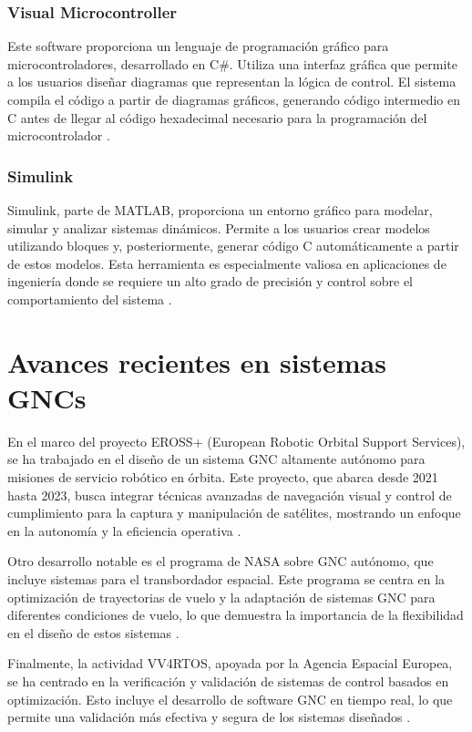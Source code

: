 \subsubsection{Visual Microcontroller}

Este software proporciona un lenguaje de programación gráfico para microcontroladores, desarrollado en C\#. Utiliza una interfaz gráfica que permite a los usuarios diseñar diagramas que representan la lógica de control. El sistema compila el código a partir de diagramas gráficos, generando código intermedio en C antes de llegar al código hexadecimal necesario para la programación del microcontrolador \cite{Sacta2011DesarrolloDU}.

\subsubsection{Simulink}
Simulink, parte de MATLAB, proporciona un entorno gráfico para modelar, simular y analizar sistemas dinámicos. Permite a los usuarios crear modelos utilizando bloques y, posteriormente, generar código C automáticamente a partir de estos modelos. Esta herramienta es especialmente valiosa en aplicaciones de ingeniería donde se requiere un alto grado de precisión y control sobre el comportamiento del sistema \cite{karris2006introduction}.

\section{Avances recientes en sistemas GNCs}

En el marco del proyecto EROSS+ (European Robotic Orbital Support Services), se ha trabajado en el diseño de un sistema GNC altamente autónomo para misiones de servicio robótico en órbita. Este proyecto, que abarca desde 2021 hasta 2023, busca integrar técnicas avanzadas de navegación visual y control de cumplimiento para la captura y manipulación de satélites, mostrando un enfoque en la autonomía y la eficiencia operativa \cite{Casu2023EROSSPA}.

Otro desarrollo notable es el programa de NASA sobre GNC autónomo, que incluye sistemas para el transbordador espacial. Este programa se centra en la optimización de trayectorias de vuelo y la adaptación de sistemas GNC para diferentes condiciones de vuelo, lo que demuestra la importancia de la flexibilidad en el diseño de estos sistemas \cite{Bordano1991AutonomousGN}.

Finalmente, la actividad VV4RTOS, apoyada por la Agencia Espacial Europea, se ha centrado en la verificación y validación de sistemas de control basados en optimización. Esto incluye el desarrollo de software GNC en tiempo real, lo que permite una validación más efectiva y segura de los sistemas diseñados \cite{Loureno2023VerificationV}.

